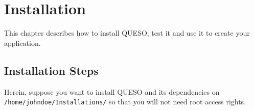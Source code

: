 \chapter{Installation}\label{ch-install}
\thispagestyle{headings}

This chapter describes how to install QUESO, test it and use it to create your application.

  

        
\section{Installation Steps}

Herein, suppose you want to install QUESO and its dependencies on \texttt{/home/johndoe/Installations/} so that you will not need root access rights. %

